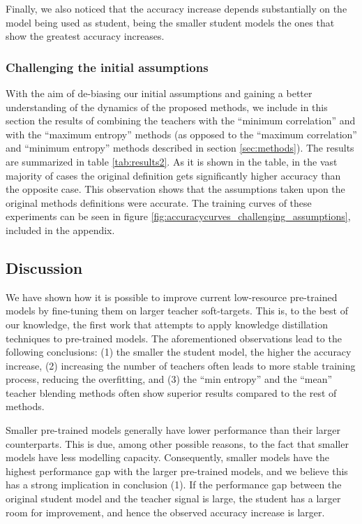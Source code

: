 \documentclass{elsarticle}
\begin{document}
	Finally, we also noticed that the accuracy increase depends substantially on the model being used as student, being the smaller student models the ones that show the greatest accuracy increases.
	
	\subsubsection{Challenging the initial assumptions}
	With the aim of de-biasing our initial assumptions and gaining a better understanding of the dynamics of the proposed methods, we include in this section the results of combining the teachers with the ``minimum correlation'' and with the ``maximum entropy'' methods (as opposed to the ``maximum correlation'' and ``minimum entropy'' methods described in section \ref{sec:methods}). The results are summarized in table \ref{tab:results2}. As it is shown in the table, in the vast majority of cases the original definition gets significantly higher accuracy than the opposite case. This observation shows that the assumptions taken upon the original methods definitions were accurate. The training curves of these experiments can be seen in figure \ref{fig:accuracycurves_challenging_assumptions}, included in the appendix.
	


	\subsection{Discussion}  \label{sec:discussion}
	We have shown how it is possible to improve current low-resource pre-trained models by fine-tuning them on larger teacher soft-targets. This is, to the best of our knowledge, the first work that attempts to apply knowledge distillation techniques to pre-trained models. The aforementioned observations lead to the following conclusions: (1) the smaller the student model, the higher the accuracy increase, (2) increasing the number of teachers often leads to more stable training process, reducing the overfitting, and (3) the ``min entropy'' and the ``mean'' teacher blending methods often show superior results compared to the rest of methods.
	
	Smaller pre-trained models generally have lower performance than their larger counterparts. This is due, among other possible reasons, to the fact that smaller models have less modelling capacity. Consequently, smaller models have the highest performance gap with the larger pre-trained models, and we believe this has a strong implication in conclusion (1). If the performance gap between the original student model and the teacher signal is large, the student has a larger room for improvement, and hence the observed accuracy increase is larger.
	
\end{document}
